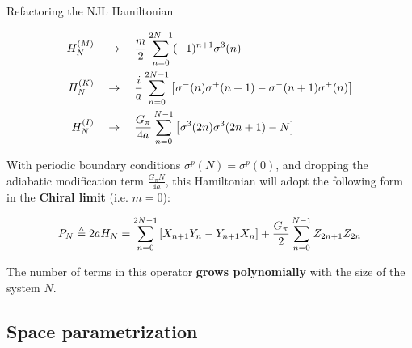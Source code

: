 \documentclass[9pt, handout, aspectratio=169]{beamer}	%
\begin{document}
\begin{frame}{Refactoring the NJL Hamiltonian}

	\vspace{-1em}

	\begin{align*}
	  H_{N}^{(M)} &\quad \rightarrow \quad
	    \frac{m}{2} \sum_{n=0}^{2N-1} (-1)^{n+1}\sigma^{3}(n) \\
	  H_{N}^{(K)} &\quad \rightarrow \quad
	    \frac{i}{a} \sum_{n=0}^{2N-1}
	    \qty[\sigma^{-}(n)\sigma^{+}(n+1) - \sigma^{-}(n+1)\sigma^{+}(n)] \\
	  H_{N}^{(I)} &\quad \rightarrow \quad
	    \frac{G_{\pi}}{4a} \sum_{n=0}^{N-1} \qty[\sigma^{3}(2n)\sigma^{3}(2n+1) - N]
	\end{align*}

	\pause

	With periodic boundary conditions $\sigma^{p}(N)=\sigma^{p}(0)$, and dropping the adiabatic modification term $\frac{G_{\pi}N}{4a}$, this Hamiltonian will adopt the following form in the \textbf{Chiral limit} (i.e. $m=0$):

	\begin{gather*} \label{eq:NJL1-refactored-hamiltonian}
	  P_{N} \triangleq 2aH_{N} =
	    \sum_{n=0}^{2N-1} \qty[X_{n+1} Y_{n} - Y_{n+1} X_{n}] +
	      \frac{G_{\pi}}{2} \sum_{n=0}^{N-1} Z_{2n+1} Z_{2n}
	\end{gather*}

	The number of terms in this operator \textbf{grows polynomially} with the size of the system $N$.

\end{frame}



\subsection{Space parametrization}
\end{document}
